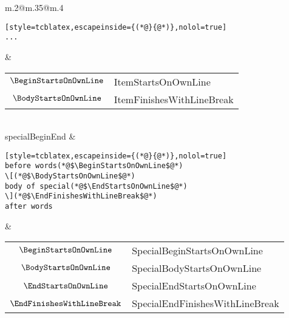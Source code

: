 \begin{longtable}{m{}@{\hspace{.75cm}}m{}@{}m{}}
\begin{lstlisting}[style=tcblatex,escapeinside={(*@}{@*)},nolol=true]
...
  \end{lstlisting}
		                                       &
		\begin{tabular}[t]{c@{~}l@{}}
			$\BeginStartsOnOwnLine$ & ItemStartsOnOwnLine       \\
			$\BodyStartsOnOwnLine$  & ItemFinishesWithLineBreak \\
		\end{tabular}
		\\
		specialBeginEnd                        &
		\begin{lstlisting}[style=tcblatex,escapeinside={(*@}{@*)},nolol=true]
before words(*@$\BeginStartsOnOwnLine$@*)
\[(*@$\BodyStartsOnOwnLine$@*)
body of special(*@$\EndStartsOnOwnLine$@*)
\](*@$\EndFinishesWithLineBreak$@*)
after words
  \end{lstlisting}
		                                       &
		\begin{tabular}[t]{c@{~}l@{}}
			$\BeginStartsOnOwnLine$     & SpecialBeginStartsOnOwnLine     \\
			$\BodyStartsOnOwnLine$      & SpecialBodyStartsOnOwnLine      \\
			$\EndStartsOnOwnLine$       & SpecialEndStartsOnOwnLine       \\
			$\EndFinishesWithLineBreak$ & SpecialEndFinishesWithLineBreak \\
		\end{tabular}
		\\
		\bottomrule
	\end{longtable}
